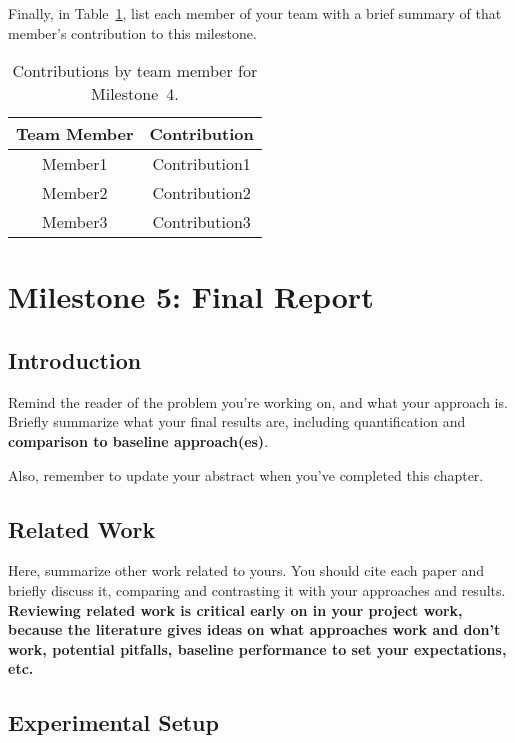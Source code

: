 \documentclass{report}
\begin{document}
Finally, in Table~\ref{tab:contribution4}, list each member of your team with a brief summary of that member's contribution to this milestone.

\begin{table}[]
    \caption{Contributions by team member for Milestone~4.}
    \centering
    \begin{tabular}{|c|c|} \hline
    {\bf Team Member}     &  {\bf Contribution}  \\ \hline
    Member1     &  Contribution1 \\
    Member2     &  Contribution2 \\
    Member3     &  Contribution3 \\ \hline
    \end{tabular}
    \label{tab:contribution4}
\end{table}

\chapter{Milestone 5: Final Report}


\section{Introduction}
\label{sec:M5-intro}

Remind the reader of the problem you're working on, and what your approach is.  Briefly summarize what your final results are, including quantification and {\bf comparison to baseline approach(es)}.

Also, remember to update your abstract when you've completed this chapter.

\section{Related Work}

Here, summarize other work related to yours.  You should cite each paper and briefly discuss it, comparing and contrasting it with your approaches and results. 
 {\bf Reviewing related work is critical early on in your project work, because the literature gives ideas on what approaches work and don't work, potential pitfalls, baseline performance to set your expectations, etc.}
 

\section{Experimental Setup}
\label{sec:M3-setup}
\end{document}
